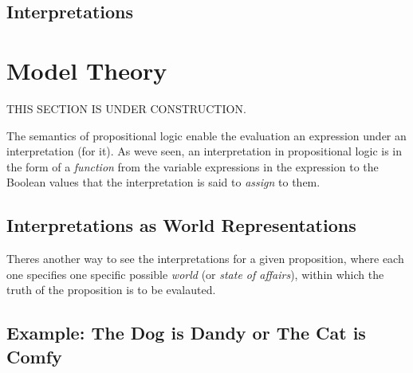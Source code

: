 \documentclass{book}
\begin{document}
\hypertarget{book__pandoc__debug__src__dmt1__lectures__l02_proplogic__formal__interpretation.lean.md}{}
\hypertarget{book__pandoc__debug__src__dmt1__lectures__l02_proplogic__formal__interpretation.lean.md__interpretations}{%
\section{Interpretations}\label{book__pandoc__debug__src__dmt1__lectures__l02_proplogic__formal__interpretation.lean.md__interpretations}}

\hypertarget{book__pandoc__debug__src__modeltheory.md}{}
\hypertarget{book__pandoc__debug__src__modeltheory.md__model-theory}{%
\chapter{Model Theory}\label{book__pandoc__debug__src__modeltheory.md__model-theory}}

THIS SECTION IS UNDER CONSTRUCTION.

The semantics of propositional logic enable the
evaluation an expression under an interpretation
(for it). As we\textquotesingle ve seen, an interpretation in
propositional logic is in the form of a \emph{function}
from the variable expressions in the expression
to the Boolean values that the interpretation is
said to \emph{assign} to them.

\hypertarget{book__pandoc__debug__src__modeltheory.md__interpretations-as-world-representations}{%
\section*{Interpretations as World Representations}\label{book__pandoc__debug__src__modeltheory.md__interpretations-as-world-representations}}

There\textquotesingle s another way to see the interpretations for
a given proposition, where each one specifies one
specific possible \emph{world} (or \emph{state of affairs}),
within which the truth of the proposition is to be evalauted.

\hypertarget{book__pandoc__debug__src__modeltheory.md__example-the-dog-is-dandy-or-the-cat-is-comfy}{%
\section*{Example: The Dog is Dandy or The Cat is Comfy}\label{book__pandoc__debug__src__modeltheory.md__example-the-dog-is-dandy-or-the-cat-is-comfy}}
\end{document}
